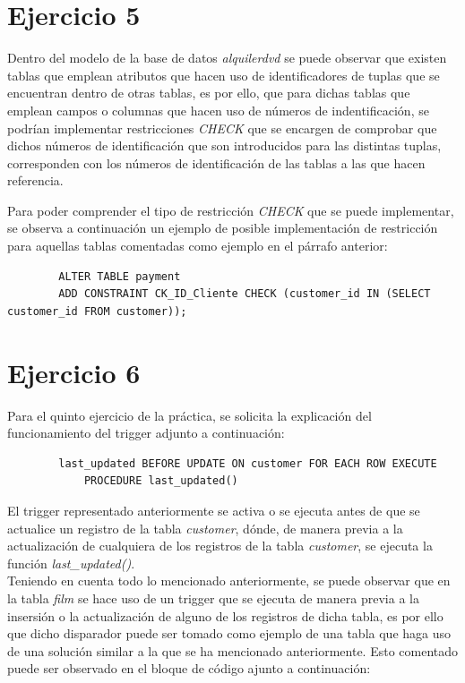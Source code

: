 \documentclass[10pt]{report}
\begin{document}
	\section{Ejercicio 5}
	Dentro del modelo de la base de datos \emph{alquilerdvd} se puede observar que existen tablas que emplean atributos que hacen uso de identificadores de tuplas que se encuentran dentro de otras tablas, es por ello, que para dichas tablas que emplean campos o columnas que hacen uso de  números de indentificación, se podrían implementar restricciones \emph{CHECK} que se encargen de comprobar que dichos números de identificación que son introducidos para las distintas tuplas,  corresponden con los números de identificación de las tablas a las que hacen referencia.

	Para poder comprender el tipo de restricción \emph{CHECK} que se puede implementar, se observa a continuación un ejemplo de posible implementación de restricción para aquellas tablas comentadas como ejemplo en el párrafo anterior:

	\begin{verbatim}
		ALTER TABLE payment
		ADD CONSTRAINT CK_ID_Cliente CHECK (customer_id IN (SELECT customer_id FROM customer));
	\end{verbatim}

	\section{Ejercicio 6}
	Para el quinto ejercicio de la práctica, se solicita la explicación del funcionamiento del trigger adjunto a continuación:

	\begin{verbatim}
		last_updated BEFORE UPDATE ON customer FOR EACH ROW EXECUTE
			PROCEDURE last_updated()
	\end{verbatim}

	El trigger representado anteriormente se activa o se ejecuta antes de que se actualice un registro de la tabla \emph{customer}, dónde, de manera previa a la actualización de cualquiera de los registros de la tabla \emph{customer}, se ejecuta la función \emph{last\_updated()}.
\\
	Teniendo en cuenta todo lo mencionado anteriormente, se puede observar que en la tabla \emph{film} se hace uso de un trigger que se ejecuta de manera previa a la insersión o la actualización de alguno de los registros de dicha tabla, es por ello que dicho disparador puede ser tomado como ejemplo de una tabla que haga uso de una solución similar a la que se ha mencionado anteriormente. Esto comentado puede ser observado en el bloque de código ajunto a continuación:
\end{document}

